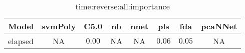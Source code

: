 \begin{table}[!ht]
	\centering
	\begin{tabular}{|c|c|c|c|c|c|c|c|}
		\hline
		Model & svmPoly & C5.0 & nb & nnet & pls & fda & pcaNNet \\ \hline
		elapsed & NA & $0.00$ & NA & NA & $0.06$ & $0.05$ & NA \\ \hline
	\end{tabular}
	\caption{time:reverse:all:importance}
	\label{tab:time:reverse:all:importance}
\end{table}
